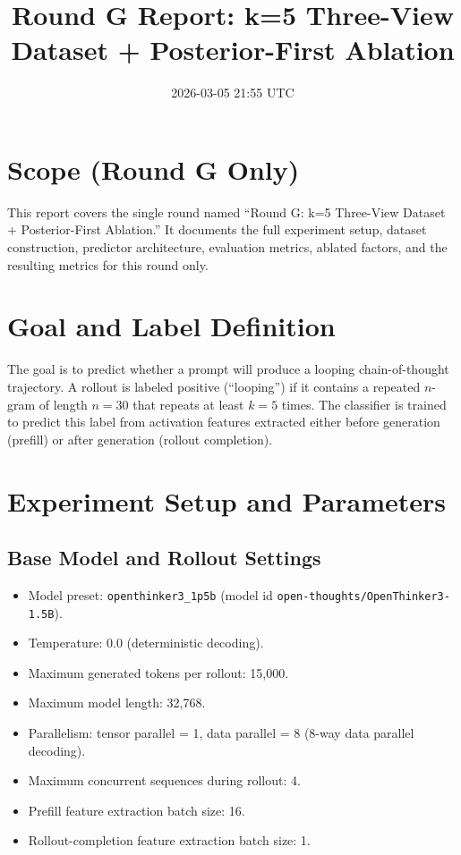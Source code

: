 \documentclass[11pt]{article}
\title{Round G Report: k=5 Three-View Dataset + Posterior-First Ablation}
\author{}
\date{2026-03-05 21:55 UTC}
\begin{document}
\maketitle

\section*{Scope (Round G Only)}
This report covers the single round named ``Round G: k=5 Three-View Dataset + Posterior-First Ablation.''
It documents the full experiment setup, dataset construction, predictor architecture, evaluation metrics,
ablated factors, and the resulting metrics for this round only.

\section*{Goal and Label Definition}
The goal is to predict whether a prompt will produce a looping chain-of-thought trajectory.
A rollout is labeled positive (``looping'') if it contains a repeated $n$-gram of length $n=30$
that repeats at least $k=5$ times. The classifier is trained to predict this label from activation
features extracted either before generation (prefill) or after generation (rollout completion).

\section*{Experiment Setup and Parameters}
\subsection*{Base Model and Rollout Settings}
\begin{itemize}
  \item Model preset: \texttt{openthinker3\_1p5b} (model id \texttt{open-thoughts/OpenThinker3-1.5B}).
  \item Temperature: 0.0 (deterministic decoding).
  \item Maximum generated tokens per rollout: 15{,}000.
  \item Maximum model length: 32{,}768.
  \item Parallelism: tensor parallel = 1, data parallel = 8 (8-way data parallel decoding).
  \item Maximum concurrent sequences during rollout: 4.
  \item Prefill feature extraction batch size: 16.
  \item Rollout-completion feature extraction batch size: 1.
\end{itemize}
\end{document}
